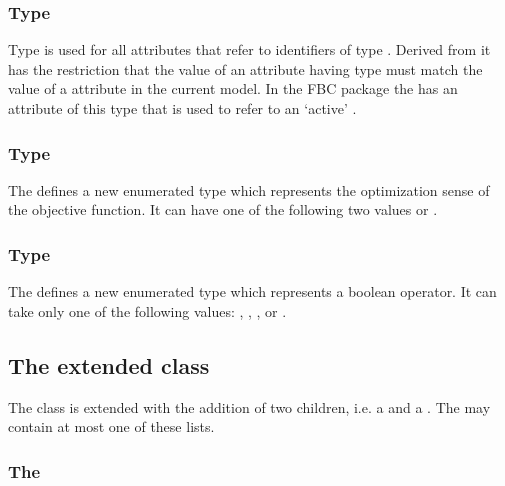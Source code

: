 \subsubsection{Type }
\label{primtype-fbcsidref}

Type  is used for all attributes that refer to
identifiers of type .  Derived from
 it has the restriction that the value of an
attribute having type  must match the value of a
 attribute in the current model. In the FBC package the 
\ListOfObjectives has an attribute of this type that is used to refer to an 
`active' \Objective.

\subsubsection{Type }
\label{primtype-fbctype}

The \FBCPackage defines a new enumerated type  which
represents the optimization sense of the objective function. It can have one
of the following two values  or .


\subsubsection{Type }
\label{primtype-fbcoperation}

The \FBCPackage defines a new enumerated type  which
represents a boolean operator. It can take only one of the following values:
, , ,  or
.

\subsection{The extended  class}
\label{sbml-model}
\label{model-class}
\label{listoffluxbounds-class}
\label{listofobjectives-class}

The \SBML \Model class is extended with the addition of two children, i.e. a 
 and a . The \Model may 
contain at most one of these lists.

\subsubsection{The \FBC {}}

